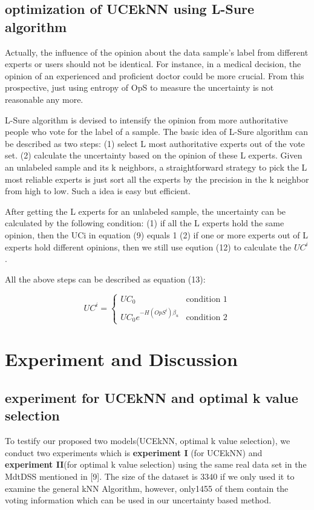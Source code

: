 \documentclass[runningheads]{llncs}
\begin{document}
\subsection{optimization of UCEkNN using L-Sure algorithm}
Actually, the influence of the opinion about the data sample's label from different  experts or users should not be identical. For instance, in a medical decision, the opinion of an experienced and proficient doctor could be more crucial. From this prospective, just using entropy of OpS to measure the uncertainty is not reasonable any more.

L-Sure algorithm is devised to intensify the opinion from more authoritative people who vote for the label of a sample. The basic idea of L-Sure algorithm can be described as two steps: (1) select L most authoritative experts out of the vote set. (2) calculate the uncertainty based on the opinion of these L experts.
Given an unlabeled sample and its k neighbors, a straightforward strategy to pick the L most reliable experts is just sort all the experts by the precision in the k neighbor from high to low. Such a idea is easy but efficient.

After getting the L experts for an unlabeled sample, the uncertainty can be calculated by the following condition: (1) if all the L experts hold the same opinion, then the UCi in equation (9) equals 1 (2) if one or more experts out of L experts hold different opinions, then we still use eqution (12) to calculate the $UC^i$.

All the above steps can be described as equation (13):

\begin{equation}
UC^i=
\begin{cases}
UC_0& \text{condition 1}\\
UC_0e^{-H(OpS^i)\beta_u}& \text{condition 2}
\end{cases}
\end{equation}

\section{Experiment and Discussion}
\subsection{experiment for UCEkNN and optimal k value selection}
To testify our proposed two models(UCEkNN, optimal k value selection), we conduct two experiments which is \textbf{experiment I} (for UCEkNN) and \textbf{experiment II}(for optimal k value selection) using the same real data set in the MdtDSS mentioned in [9]. The size of the dataset is 3340 if we only used it to examine the general kNN Algorithm, however, only1455 of them contain the voting information which can be used in our uncertainty based method. 
\end{document}
